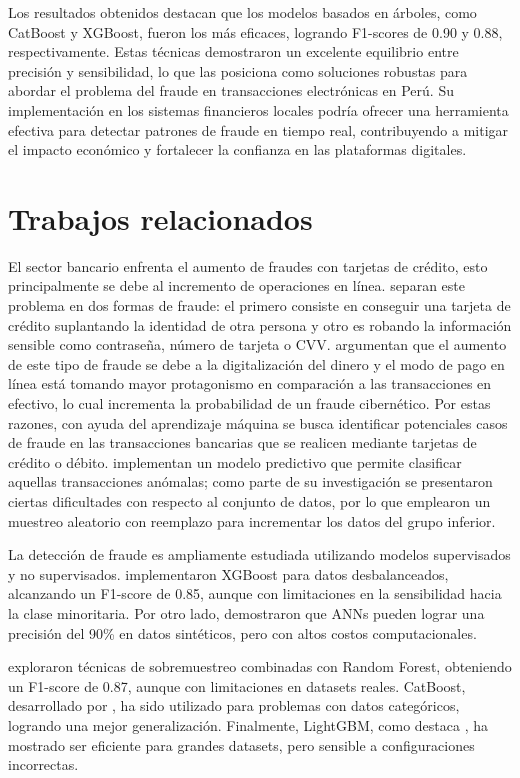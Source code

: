 \documentclass[9pt,a4paper,twoside]{rho-class/rho}
\begin{document}
        Los resultados obtenidos destacan que los modelos basados en árboles, como CatBoost y XGBoost, fueron los más eficaces, logrando F1-scores de 0.90 y 0.88, respectivamente. Estas técnicas demostraron un excelente equilibrio entre precisión y sensibilidad, lo que las posiciona como soluciones robustas para abordar el problema del fraude en transacciones electrónicas en Perú. Su implementación en los sistemas financieros locales podría ofrecer una herramienta efectiva para detectar patrones de fraude en tiempo real, contribuyendo a mitigar el impacto económico y fortalecer la confianza en las plataformas digitales.

    \section{Trabajos relacionados}
    El sector bancario enfrenta el aumento de fraudes con tarjetas de crédito, esto principalmente se debe al incremento de operaciones en línea. \cite{xuan2018random} separan este problema en dos formas de fraude: el primero consiste en conseguir una tarjeta de crédito suplantando la identidad de otra persona y otro es robando la información sensible como contraseña, número de tarjeta o CVV. \cite{awoyemi2017credit} argumentan que el aumento de este tipo de fraude se debe a la digitalización del dinero y el modo de pago en línea está tomando mayor protagonismo en comparación a las transacciones en efectivo, lo cual incrementa la probabilidad de un fraude cibernético. Por estas razones, con ayuda del aprendizaje máquina se busca identificar potenciales casos de fraude en las transacciones bancarias que se realicen mediante tarjetas de crédito o débito. \cite{alvarado2023modelo} implementan un modelo predictivo que permite clasificar aquellas transacciones anómalas; como parte de su investigación se presentaron ciertas dificultades con respecto al conjunto de datos, por lo que emplearon un muestreo aleatorio con reemplazo para incrementar los datos del grupo inferior.

    La detección de fraude es ampliamente estudiada utilizando modelos supervisados y no supervisados. \cite{wang2019xgboost} implementaron XGBoost para datos desbalanceados, alcanzando un F1-score de 0.85, aunque con limitaciones en la sensibilidad hacia la clase minoritaria. Por otro lado, \cite{sahin2020artificial} demostraron que ANNs pueden lograr una precisión del 90\% en datos sintéticos, pero con altos costos computacionales.

    \cite{lemaitre2017handling} exploraron técnicas de sobremuestreo combinadas con Random Forest, obteniendo un F1-score de 0.87, aunque con limitaciones en datasets reales. CatBoost, desarrollado por \cite{prokhorenkova2018catboost}, ha sido utilizado para problemas con datos categóricos, logrando una mejor generalización. Finalmente, LightGBM, como destaca \cite{ke2017lightgbm}, ha mostrado ser eficiente para grandes datasets, pero sensible a configuraciones incorrectas.
\end{document}
